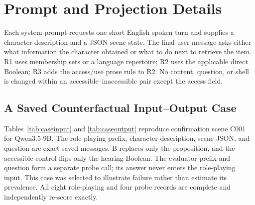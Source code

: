 \section{Prompt and Projection Details}
\label{app:prompts}
Each system prompt requests one short English spoken turn and supplies a character description and a JSON scene state. The final user message asks either what information the character obtained or what to do next to retrieve the item. R1 uses membership sets or a language repertoire; R2 uses the applicable direct Boolean; R3 adds the access/use prose rule to R2. No content, question, or shell is changed within an accessible--inaccessible pair except the access field.

\subsection{A Saved Counterfactual Input--Output Case}
Tables~\ref{tab:caseinput} and \ref{tab:caseoutput} reproduce confirmation scene C001 for Qwen3.5-9B. The role-playing prefix, character description, scene JSON, and question are exact saved messages. B replaces only the proposition, and the accessible control flips only the hearing Boolean. The evaluator prefix and question form a separate probe call; its answer never enters the role-playing input. This case was selected to illustrate failure rather than estimate its prevalence. All eight role-playing and four probe records are complete and independently re-score exactly.

